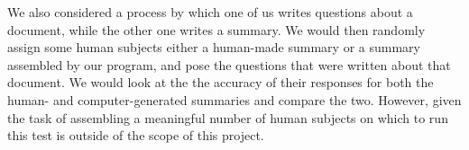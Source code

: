 \documentclass[12pt]{article}
\theoremstyle{plain}
\theoremstyle{definition}
\theoremstyle{remark}
\theoremstyle{plain}
\begin{document}
We also considered a process by which one of us writes questions about a document, while the other one writes a summary. We would then randomly assign some human subjects either a human-made summary or a summary assembled by our program, and pose the questions that were written about that document. We would look at the the accuracy of their responses for both the human- and computer-generated summaries and compare the two. However, given the task of assembling a meaningful number of human subjects on which to run this test is outside of the scope of this project.
\end{document}
